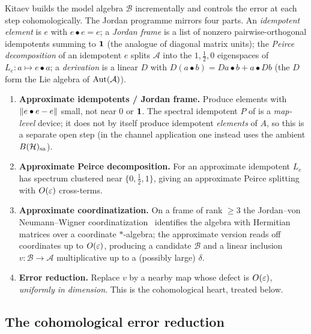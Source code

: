 Kitaev builds the model algebra $\mathcal{B}$ incrementally and controls the
error at each step cohomologically. The Jordan programme mirrors four parts.
An \emph{idempotent element} is $e$ with $e\bullet e=e$; a \emph{Jordan frame} is
a list of nonzero pairwise-orthogonal idempotents summing to $\mathbf{1}$ (the analogue
of diagonal matrix units); the \emph{Peirce decomposition} of an idempotent $e$
splits $\mathcal A$ into the $1,\tfrac12,0$ eigenspaces of $L_e\colon a\mapsto
e\bullet a$; a \emph{derivation} is a linear $D$ with
$D(a\bullet b)=Da\bullet b+a\bullet Db$ (the $D$ form the Lie algebra of
$\operatorname{Aut}(\mathcal A)$).
\begin{enumerate}[label=\textbf{(\alph*)},leftmargin=*]
  \item \textbf{Approximate idempotents / Jordan frame.} Produce elements with
    $\lVert e\bullet e-e \rVert$ small, not near $0$ or $\mathbf{1}$. The spectral idempotent
    $P$ of  is a \emph{map-level} device; it does not by
    itself produce idempotent \emph{elements} of $A$, so this is a separate open
    step (in the channel application one instead uses the ambient $B(\mathcal{H})_{\mathrm{sa}}$).
  \item \textbf{Approximate Peirce decomposition.} For an approximate idempotent
    $L_e$ has spectrum clustered near $\{0,\tfrac12,1\}$, giving an approximate
    Peirce splitting with $O(\varepsilon)$ cross-terms.
  \item \textbf{Approximate coordinatization.} On a frame of rank $\ge3$ the
    Jordan--von Neumann--Wigner coordinatization~\cite{JordanVonNeumannWigner1934}
    identifies the algebra with Hermitian matrices over a coordinate $*$-algebra;
    the approximate version reads off coordinates up to $O(\varepsilon)$, producing a
    candidate $\mathcal B$ and a linear inclusion $v\colon\mathcal B\to\mathcal A$
    multiplicative up to a (possibly large) $\delta$.
  \item \textbf{Error reduction.} Replace $v$ by a nearby map whose defect is
    $O(\varepsilon)$, \emph{uniformly in dimension}. This is the cohomological heart,
    treated below.
\end{enumerate}

\subsection{The cohomological error reduction}

